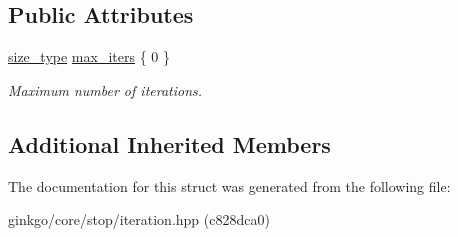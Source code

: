 \subsection*{Public Attributes}
\begin{DoxyCompactItemize}
\item 
\mbox{\label{structgko_1_1stop_1_1Iteration_1_1parameters__type_a7daf7ecb5cf107b9e7444b0898f691c4}} 
\hyperlink{namespacegko_a6e5c95df0ae4e47aab2f604a22d98ee7}{size\+\_\+type} \hyperlink{structgko_1_1stop_1_1Iteration_1_1parameters__type_a7daf7ecb5cf107b9e7444b0898f691c4}{max\+\_\+iters} \{ 0 \}
\begin{DoxyCompactList}\small\item\em Maximum number of iterations. \end{DoxyCompactList}\end{DoxyCompactItemize}
\subsection*{Additional Inherited Members}


The documentation for this struct was generated from the following file\+:\begin{DoxyCompactItemize}
\item 
ginkgo/core/stop/iteration.\+hpp (c828dca0)\end{DoxyCompactItemize}
